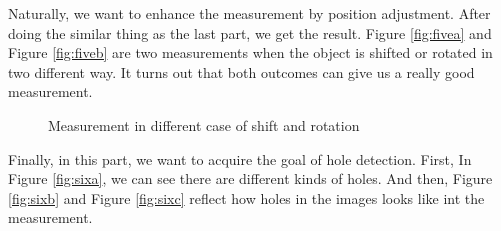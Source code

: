 \documentclass[english]{article}
\begin{document}
Naturally, we want to enhance the measurement by position adjustment. After doing the similar thing as the last part, we get the result. Figure \ref{fig:fivea} and Figure \ref{fig:fiveb} are two measurements when the object is shifted or rotated in two different way. It turns out that both outcomes can give us a really good measurement.

\begin{figure}[H]
	\centering
	\caption{Measurement in different case of shift and rotation}
	\label{fig:five}
\end{figure}

Finally, in this part, we want to acquire the goal of hole detection. First, In Figure \ref{fig:sixa}, we can see there are different kinds of holes. And then, Figure \ref{fig:sixb} and Figure \ref{fig:sixc} reflect how holes in the images looks like int the measurement. 
\end{document}
